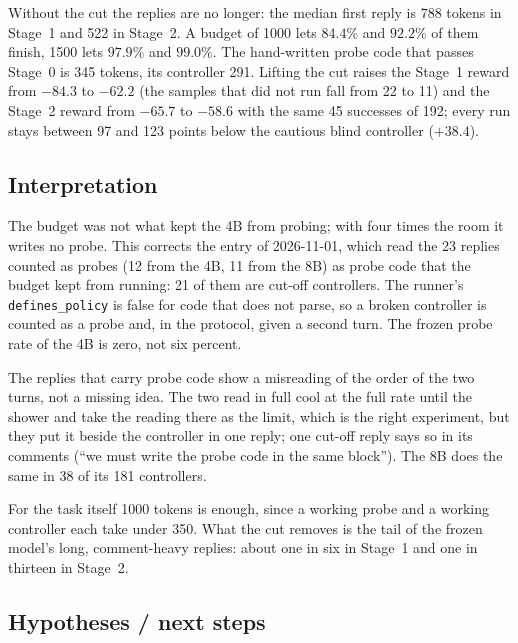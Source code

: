 \documentclass[11pt,a4paper]{article}
\begin{document}
Without the cut the replies are no longer: the median first reply is 788
tokens in Stage~1 and 522 in Stage~2. A budget of 1000 lets $84.4\%$ and
$92.2\%$ of them finish, 1500 lets $97.9\%$ and $99.0\%$. The hand-written
probe code that passes Stage~0 is 345 tokens, its controller 291. Lifting
the cut raises the Stage~1 reward from $-84.3$ to $-62.2$ (the samples that
did not run fall from 22 to 11) and the Stage~2 reward from $-65.7$ to
$-58.6$ with the same 45 successes of 192; every run stays between 97 and
123 points below the cautious blind controller ($+38.4$).

\subsection*{Interpretation}

The budget was not what kept the 4B from probing; with four times the room
it writes no probe. This corrects the entry of 2026-11-01, which read the 23
replies counted as probes (12 from the 4B, 11 from the 8B) as probe code
that the budget kept from running: 21 of them are cut-off controllers. The
runner's \texttt{defines\_policy} is false for code that does not parse, so
a broken controller is counted as a probe and, in the protocol, given a
second turn. The frozen probe rate of the 4B is zero, not six percent.

The replies that carry probe code show a misreading of the order of the two
turns, not a missing idea. The two read in full cool at the full rate until
the shower and take the reading there as the limit, which is the right
experiment, but they put it beside the controller in one reply; one cut-off
reply says so in its comments (``we must write the probe code in the same
block''). The 8B does the same in 38 of its 181 controllers.

For the task itself 1000 tokens is enough, since a working probe and a
working controller each take under 350. What the cut removes is the tail of
the frozen model's long, comment-heavy replies: about one in six in Stage~1
and one in thirteen in Stage~2.

\subsection*{Hypotheses / next steps}
\end{document}

